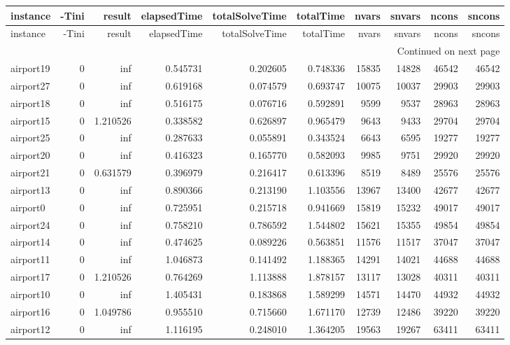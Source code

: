 \begin{longtable}{|l|r|r|r|r|r|r|r|r|r|}
\toprule
instance & -Tini & result & elapsedTime & totalSolveTime & totalTime & nvars & snvars & ncons & sncons \\
\midrule
\endfirsthead
\toprule
instance & -Tini & result & elapsedTime & totalSolveTime & totalTime & nvars & snvars & ncons & sncons \\
\midrule
\endhead
\midrule
\multicolumn{10}{r}{Continued on next page} \\
\midrule
\endfoot
\bottomrule
\endlastfoot
airport19 & 0 & inf & 0.545731 & 0.202605 & 0.748336 & 15835 & 14828 & 46542 & 46542 \\
airport27 & 0 & inf & 0.619168 & 0.074579 & 0.693747 & 10075 & 10037 & 29903 & 29903 \\
airport18 & 0 & inf & 0.516175 & 0.076716 & 0.592891 & 9599 & 9537 & 28963 & 28963 \\
airport15 & 0 & 1.210526 & 0.338582 & 0.626897 & 0.965479 & 9643 & 9433 & 29704 & 29704 \\
airport25 & 0 & inf & 0.287633 & 0.055891 & 0.343524 & 6643 & 6595 & 19277 & 19277 \\
airport20 & 0 & inf & 0.416323 & 0.165770 & 0.582093 & 9985 & 9751 & 29920 & 29920 \\
airport21 & 0 & 0.631579 & 0.396979 & 0.216417 & 0.613396 & 8519 & 8489 & 25576 & 25576 \\
airport13 & 0 & inf & 0.890366 & 0.213190 & 1.103556 & 13967 & 13400 & 42677 & 42677 \\
airport0 & 0 & inf & 0.725951 & 0.215718 & 0.941669 & 15819 & 15232 & 49017 & 49017 \\
airport24 & 0 & inf & 0.758210 & 0.786592 & 1.544802 & 15621 & 15355 & 49854 & 49854 \\
airport14 & 0 & inf & 0.474625 & 0.089226 & 0.563851 & 11576 & 11517 & 37047 & 37047 \\
airport11 & 0 & inf & 1.046873 & 0.141492 & 1.188365 & 14291 & 14021 & 44688 & 44688 \\
airport17 & 0 & 1.210526 & 0.764269 & 1.113888 & 1.878157 & 13117 & 13028 & 40311 & 40311 \\
airport10 & 0 & inf & 1.405431 & 0.183868 & 1.589299 & 14571 & 14470 & 44932 & 44932 \\
airport16 & 0 & 1.049786 & 0.955510 & 0.715660 & 1.671170 & 12739 & 12486 & 39220 & 39220 \\
airport12 & 0 & inf & 1.116195 & 0.248010 & 1.364205 & 19563 & 19267 & 63411 & 63411 \\

\end{longtable}
